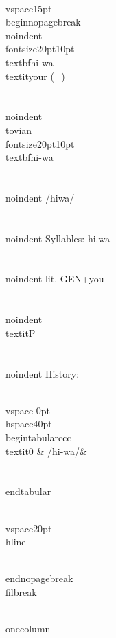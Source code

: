 \\vspace{15pt}
\\begin{nopagebreak}
\\noindent{\\fontsize{20pt}{10pt}\\textbf{hi-wa} } \\textit{your} (_)\\\\
\\noindent {\\tovian \\fontsize{20pt}{10pt} \\textbf{hi-wa} }\\\\
\\noindent /h{\textprimstress}iwa/\\\\
\\noindent Syllables: hi.wa\\\\
\\noindent lit. GEN+you\\\\
\\noindent \\textit{P}\\\\


\\noindent History:

\\vspace{-0pt}
\\hspace{40pt}
\\begin{tabular}{ccc}
\\textit{0} & /hi-wa/& \\\\
\\end{tabular}

\\vspace{20pt}\\hline

\\end{nopagebreak}
\\filbreak



\\onecolumn

